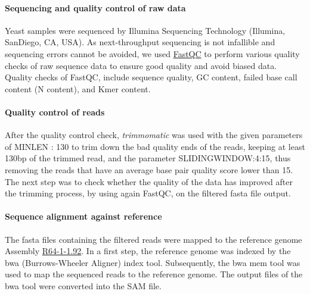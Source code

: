 \documentclass[10pt,a4paper]{article}
\begin{document}
\paragraph{Sequencing and quality control of raw data} Yeast samples were sequenced by Illumina Sequencing Technology (Illumina, SanDiego, CA, USA). As next-throughput sequencing is not infallible and sequencing errors cannot be avoided, we used \href{http://www.bioinformatics.babraham.ac.uk/projects/fastqc/}{FastQC} to perform various quality checks of raw sequence data to ensure good quality and avoid biased data. Quality checks of FastQC, include sequence quality, GC content, failed base call content (N content), and Kmer content.


\paragraph{Quality control of reads} After the quality control check, \textit{trimmomatic}\cite{bolger_trimmomatic:_2014} was used with the given parameters of MINLEN : 130 to trim down the bad quality ends of the reads, keeping at least 130bp of the trimmed read, and the parameter SLIDINGWINDOW:4:15, thus removing the reads that have an average base pair quality score lower than 15. The next step was to check whether the quality of the data has improved after the trimming process, by using again FastQC, on the filtered fasta file output.

\paragraph{Sequence alignment against reference} The fasta files containing the filtered reads were mapped to the reference genome Assembly \href{https://www.ensembl.org/Saccharomyces_cerevisiae/Info/Index}{R64-1-1.92}. In a first step, the reference genome was indexed by the bwa (Burrows-Wheeler Aligner) index tool\cite{li_fast_2010}. Subsequently, the bwa mem tool was used to map the sequenced reads to the reference genome. The output files of the bwa tool were converted into the SAM file\cite{li_sequence_2009}.
 
\end{document}
